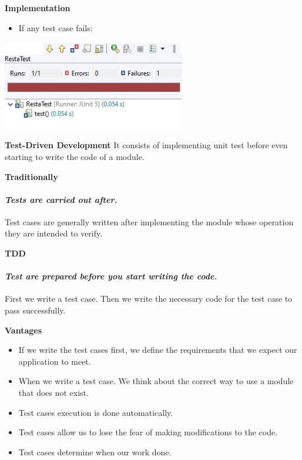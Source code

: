 \documentclass[11pt]{beamer}
\begin{document}

\begin{frame}{\textbf{Implementation}}

\begin{itemize}
\item If any test case fails:
\end{itemize}

\begin{center}
\includegraphics[width=8.0cm]{img/False.jpg}
\end{center}

\end{frame}


\begin{frame}{\textbf{Test-Driven Development}}
It consists of implementing unit test before even starting to write the code of a module.
\end{frame}


\begin{frame}{\textbf{Traditionally}}
\framesubtitle{\textit{Tests are carried out after.}}
Test cases are generally written after implementing the module whose operation they are intended to verify.
\end{frame}


\begin{frame}{\textbf{TDD}}
\framesubtitle{\textit{Test are prepared before you start writing the code.}}
First we write a test case. Then we write the necessary code for the test case to pass successfully.
\end{frame}


\begin{frame}{\textbf{Vantages}}

\begin{itemize}
\item If we write the test cases first, we define the requirements that we expect our application to meet.
\item When we write a test case. We think about the correct way to use a module that does not exist.
\item Test cases execution is done automatically.
\item Test cases allow us to lose the fear of making modifications to the code.
\item Test cases determine when our work done.
\end{itemize}
\end{frame}
\end{document}
